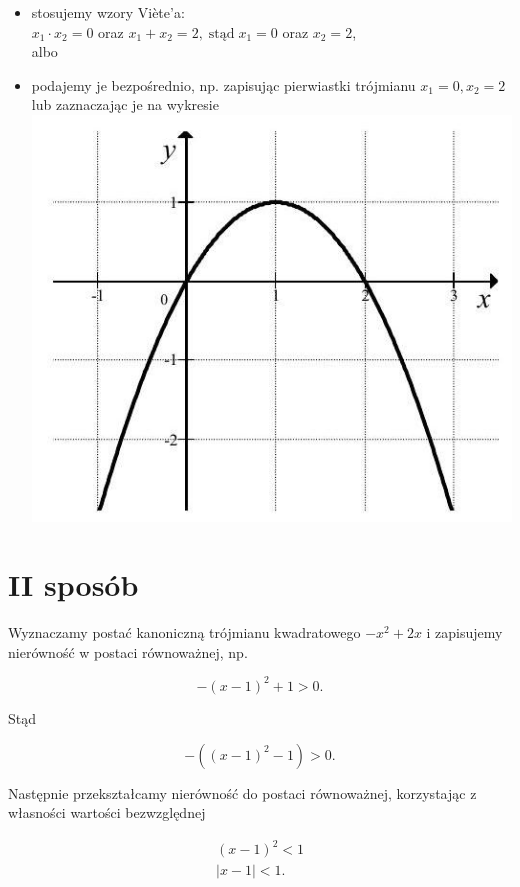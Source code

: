 \documentclass[10pt]{article}
\begin{document}
\begin{itemize}
  \item stosujemy wzory Viète'a:\\
$x_{1} \cdot x_{2}=0$ oraz $x_{1}+x_{2}=2, \operatorname{stąd} x_{1}=0$ oraz $x_{2}=2$,\\
albo
  \item podajemy je bezpośrednio, np. zapisując pierwiastki trójmianu $x_{1}=0, x_{2}=2$ lub zaznaczając je na wykresie\\
\includegraphics[max width=\textwidth, center]{2025_02_07_261058dfc2ab779a027ag-07}
\end{itemize}

\section*{II sposób}
Wyznaczamy postać kanoniczną trójmianu kwadratowego $-x^{2}+2 x$ i zapisujemy nierówność w postaci równoważnej, np.

$$
-(x-1)^{2}+1>0 .
$$

Stąd

$$
-\left((x-1)^{2}-1\right)>0 .
$$

Następnie przekształcamy nierówność do postaci równoważnej, korzystając z własności wartości bezwzględnej

$$
\begin{gathered}
(x-1)^{2}<1 \\
|x-1|<1 .
\end{gathered}
$$
\end{document}
